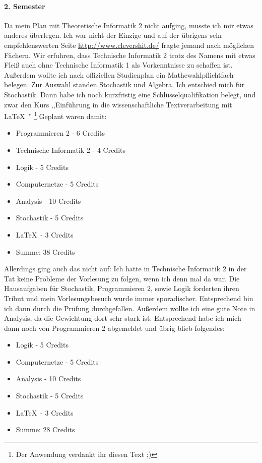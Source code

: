\paragraph{2. Semester}
Da mein Plan mit Theoretische Informatik 2 nicht aufging, musste ich
mir etwas anderes überlegen. Ich war nicht der Einzige und auf der
übrigens sehr empfehlenswerten Seite \url{http://www.clevershit.de/}
fragte jemand nach möglichen Fächern. Wir erfuhren, dass Technische
Informatik 2 trotz des Namens mit etwas Fleiß auch ohne Technische
Informatik 1 als Vorkenntnisse zu schaffen ist. Außerdem wollte ich
nach offiziellen Studienplan ein Mathewahlpflichtfach belegen. Zur
Auswahl standen Stochastik und Algebra. Ich entschied mich für
Stochastik. Dann habe ich  noch kurzfristig eine
Schlüsselqualifikation belegt, und zwar den Kurs ,,Einführung in die
wissenschaftliche Textverarbeitung mit \LaTeX\ '' \footnote{Der
  Anwendung verdankt ihr diesen Text ;)}.\newpage Geplant waren damit:
\begin{itemize}
\item Programmieren 2 - 6 Credits
\item Technische Informatik 2 - 4 Credits
\item Logik  - 5 Credits 
\item Computernetze - 5 Credits
\item Analysis - 10 Credits
\item Stochastik - 5 Credits
\item \LaTeX\ - 3 Credits
\item Summe: 38 Credits
\end{itemize}
Allerdings ging auch das nicht auf: Ich hatte in Technische Informatik
2 in der Tat keine Probleme der Vorlesung zu folgen, wenn ich denn mal
da war. Die Hausaufgaben für Stochastik, Programmieren 2, sowie Logik
forderten ihren Tribut und mein Vorlesungsbesuch wurde immer
sporadischer. Entsprechend bin ich dann durch die Prüfung
durchgefallen. Außerdem wollte ich eine gute Note in Analysis, da die
Gewichtung dort sehr stark ist. Entsprechend habe ich mich dann noch
von Programmieren 2 abgemeldet und übrig blieb folgendes:
\begin{itemize}
\item Logik  - 5 Credits 
\item Computernetze - 5 Credits
\item Analysis - 10 Credits
\item Stochastik - 5 Credits
\item \LaTeX\ - 3 Credits
\item Summe: 28 Credits
\end{itemize}

